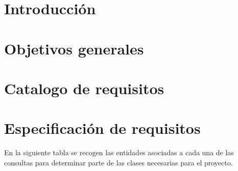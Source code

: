 
\section{Introducción}

\section{Objetivos generales}

\section{Catalogo de requisitos}

\section{Especificación de requisitos}
En la siguiente tabla se recogen las entidades asociadas a cada una de las consultas para determinar parte de las clases necesarias para el proyecto.
